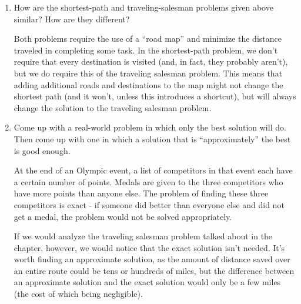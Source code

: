 \documentclass[Chapter01]{subfiles}
\begin{document}
\begin{enumerate}
		\item How are the shortest-path and traveling-salesman problems given above similar? How are they different?
		\begin{answer}
			Both problems require the use of a ``road map'' and minimize the distance traveled in completing some task. In the shortest-path problem, we don't require that every destination is visited (and, in fact, they probably aren't), but we do require this of the traveling salesman problem. This means that adding additional roads and destinations to the map might not change the shortest path (and it won't, unless this introduces a shortcut), but will always change the solution to the traveling salesman problem.
		\end{answer}

		\item Come up with a real-world problem in which only the best solution will do. Then come up with one in which a solution that is ``approximately'' the best is good enough.
		\begin{answer}
			At the end of an Olympic event, a list of competitors in that event each have a certain number of points. Medals are given to the three competitors who have more points than anyone else. The problem of finding these three competitors is exact - if someone did better than everyone else and did not get a medal, the problem would not be solved appropriately.
			
			If we would analyze the traveling salesman problem talked about in the chapter, however, we would notice that the exact solution isn't needed. It's worth finding an approximate solution, as the amount of distance saved over an entire route could be tens or hundreds of miles, but the difference between an approximate solution and the exact solution would only be a few miles (the cost of which being negligible).
		\end{answer}
	\end{enumerate}
\end{document}
